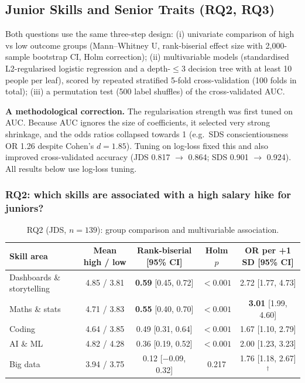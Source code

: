 \subsection{Junior Skills and Senior Traits (RQ2, RQ3)}\label{sec:rq23}

Both questions use the same three-step design: (i) univariate comparison of high vs low outcome
groups (Mann--Whitney U, rank-biserial effect size with 2,000-sample bootstrap CI, Holm
correction); (ii) multivariable models (standardised L2-regularised logistic regression and a
depth-$\leq 3$ decision tree with at least 10 people per leaf), scored by repeated stratified
5-fold cross-validation (100 folds in total); (iii) a permutation test (500 label shuffles) of the
cross-validated AUC.

\textbf{A methodological correction.} The regularisation strength was first tuned on AUC. Because
AUC ignores the size of coefficients, it selected very strong shrinkage, and the odds ratios
collapsed towards 1 (e.g.\ SDS conscientiousness OR 1.26 despite Cohen's $d = 1.85$). Tuning on
log-loss fixed this and also improved cross-validated accuracy (JDS 0.817 $\rightarrow$ 0.864;
SDS 0.901 $\rightarrow$ 0.924). All results below use log-loss tuning.

\subsubsection{RQ2: which skills are associated with a high salary hike for juniors?}

\begin{table}[H]\centering\small
\caption{RQ2 (JDS, $n=139$): group comparison and multivariable association.}\label{tab:rq2}
\setlength{\tabcolsep}{4pt}\begin{tabular}{@{}l c c c c@{}}
\toprule
Skill area & Mean high / low & Rank-biserial [95\% CI] & Holm $p$ & OR per +1 SD [95\% CI]\\
\midrule
Dashboards \& storytelling & 4.85 / 3.81 & \textbf{0.59} [0.45, 0.72] & $<0.001$ & 2.72 [1.77, 4.73]\\
Maths \& stats & 4.71 / 3.83 & \textbf{0.55} [0.40, 0.70] & $<0.001$ & \textbf{3.01} [1.99, 4.60]\\
Coding & 4.64 / 3.85 & 0.49 [0.31, 0.64] & $<0.001$ & 1.67 [1.10, 2.79]\\
AI \& ML & 4.82 / 4.28 & 0.36 [0.19, 0.52] & $<0.001$ & 2.00 [1.23, 3.23]\\
Big data & 3.94 / 3.75 & 0.12 [$-$0.09, 0.32] & 0.217 & 1.76 [1.18, 2.67]$^\dagger$\\
\bottomrule
\end{tabular}
\end{table}

